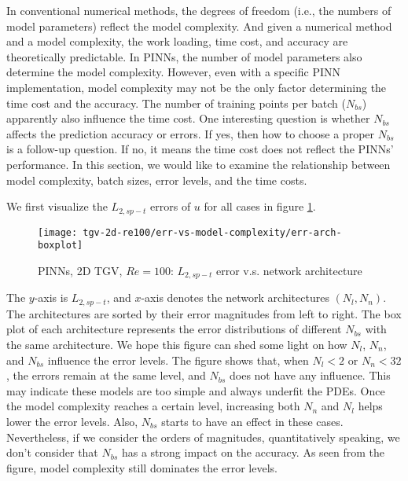 
In conventional numerical methods, the degrees of freedom (i.e., the numbers of model parameters) reflect the model complexity.
And given a numerical method and a model complexity, the work loading, time cost, and accuracy are theoretically predictable.
In PINNs, the number of model parameters also determine the model complexity.
However, even with a specific PINN implementation, model complexity may not be the only factor determining the time cost and the accuracy.
The number of training points per batch ($N_{bs}$) apparently also influence the time cost.
One interesting question is whether $N_{bs}$ affects the prediction accuracy or errors.
If yes, then how to choose a proper $N_{bs}$ is a follow-up question. 
If no, it means the time cost does not reflect the PINNs' performance.
In this section, we would like to examine the relationship between model complexity, batch sizes, error levels, and the time costs.

We first visualize the $L_{2,sp-t}$ errors of $u$ for all cases in figure \ref{fig:tgv2d-re100-err-vs-arch}.
\begin{figure}[hbt!]
    \centering%
    \texttt{[image: tgv-2d-re100/err-vs-model-complexity/err-arch-boxplot]}
    \caption[%
        PINNs, 2D TGV, $Re=100$: $L_{2,sp-t}$ error v.s. network architecture%
    ]{%
        PINNs, 2D TGV, $Re=100$: $L_{2,sp-t}$ error v.s. network architecture%
    }
    \label{fig:tgv2d-re100-err-vs-arch}
\end{figure}
The $y$-axis is $L_{2,sp-t}$, and $x$-axis denotes the network architectures $(N_l, N_n)$.
The architectures are sorted by their error magnitudes from left to right.
The box plot of each architecture represents the error distributions of different $N_{bs}$ with the same architecture.
We hope this figure can shed some light on how $N_l$, $N_n$, and $N_{bs}$ influence the error levels.
The figure shows that, when $N_l < 2$ or $N_n < 32$, the errors remain at the same level, and $N_{bs}$ does not have any influence.
This may indicate these models are too simple and always underfit the PDEs.
Once the model complexity reaches a certain level, increasing both $N_n$ and $N_l$ helps lower the error levels.
Also, $N_{bs}$ starts to have an effect in these cases.
Nevertheless, if we consider the orders of magnitudes, quantitatively speaking, we don't consider that $N_{bs}$ has a strong impact on the accuracy.
As seen from the figure, model complexity still dominates the error levels. 

